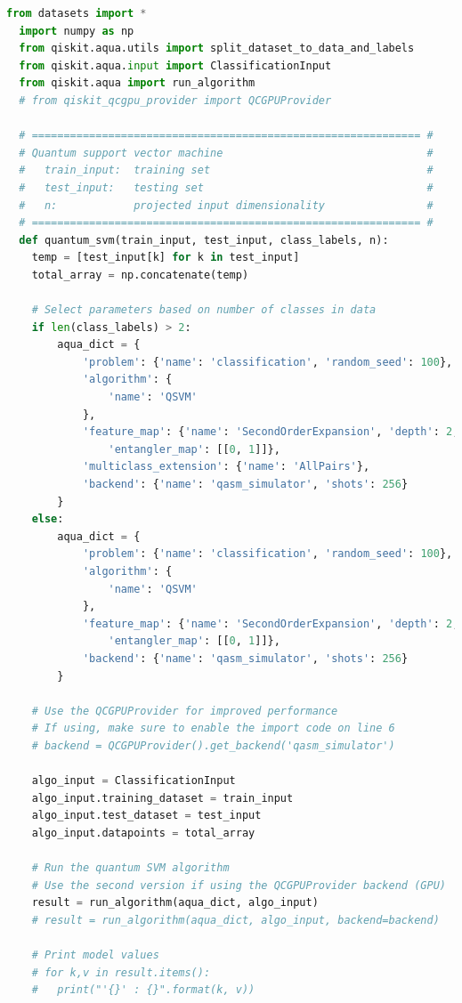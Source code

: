 \documentclass{article}
\begin{document}
  \begin{lstlisting}[language=Python]
  from datasets import *
  import numpy as np
  from qiskit.aqua.utils import split_dataset_to_data_and_labels
  from qiskit.aqua.input import ClassificationInput
  from qiskit.aqua import run_algorithm
  # from qiskit_qcgpu_provider import QCGPUProvider

  # ============================================================= #
  # Quantum support vector machine                                #
  #   train_input:  training set                                  #
  #   test_input:   testing set                                   #
  #   n:            projected input dimensionality                #
  # ============================================================= #
  def quantum_svm(train_input, test_input, class_labels, n):
    temp = [test_input[k] for k in test_input]
    total_array = np.concatenate(temp)

    # Select parameters based on number of classes in data
    if len(class_labels) > 2:
        aqua_dict = {
            'problem': {'name': 'classification', 'random_seed': 100},
            'algorithm': {
                'name': 'QSVM'
            },
            'feature_map': {'name': 'SecondOrderExpansion', 'depth': 2, \
                'entangler_map': [[0, 1]]},
            'multiclass_extension': {'name': 'AllPairs'},
            'backend': {'name': 'qasm_simulator', 'shots': 256}
        }
    else:
        aqua_dict = {
            'problem': {'name': 'classification', 'random_seed': 100},
            'algorithm': {
                'name': 'QSVM'
            },
            'feature_map': {'name': 'SecondOrderExpansion', 'depth': 2, \
                'entangler_map': [[0, 1]]},
            'backend': {'name': 'qasm_simulator', 'shots': 256}
        }

    # Use the QCGPUProvider for improved performance
    # If using, make sure to enable the import code on line 6
    # backend = QCGPUProvider().get_backend('qasm_simulator')

    algo_input = ClassificationInput
    algo_input.training_dataset = train_input
    algo_input.test_dataset = test_input
    algo_input.datapoints = total_array

    # Run the quantum SVM algorithm
    # Use the second version if using the QCGPUProvider backend (GPU)
    result = run_algorithm(aqua_dict, algo_input)
    # result = run_algorithm(aqua_dict, algo_input, backend=backend)

    # Print model values
    # for k,v in result.items():
    #   print("'{}' : {}".format(k, v))


\end{lstlisting}
\end{document}
